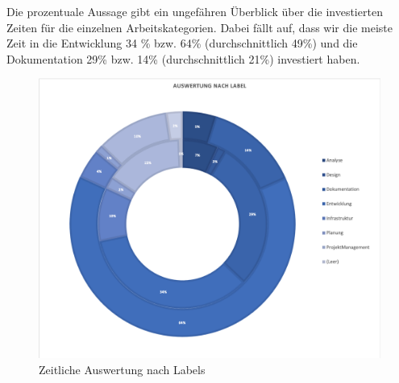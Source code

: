 Die prozentuale Aussage gibt ein ungefähren Überblick über die investierten Zeiten für die einzelnen Arbeitskategorien. Dabei fällt auf, dass wir die meiste Zeit in die Entwicklung 34 \% bzw. 64\% (durchschnittlich 49\%) und die Dokumentation 29\% bzw. 14\% (durchschnittlich 21\%) investiert haben.

\begin{figure}[h]
	\centering
	\includegraphics[width=1\linewidth]{./img/zeitauswertung/ZeitauswertungLabel}
	\caption{Zeitliche Auswertung nach Labels}
	\label{fig:comparison-labels}
\end{figure}
